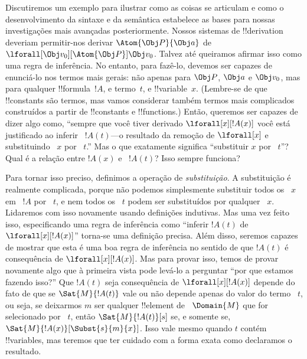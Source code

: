 \documentclass[../../../include/open-logic-section]{subfiles}
\begin{document}


Discutiremos um exemplo para ilustrar como as coisas se articulam e
como o desenvolvimento da sintaxe e da semântica estabelece as bases para
nossas investigações mais avançadas posteriormente. Nossos sistemas de !!{derivation} deveriam permitir-nos
derivar $\Atom{\Obj P}{\Obj a}$ de $\lforall[\Obj
v_0][\Atom{\Obj P}]{\Obj v_0}$. Talvez até queiramos afirmar isso como uma
regra de inferência. No entanto, para fazê-lo, devemos ser capazes de enunciá-lo
nos termos mais gerais: não apenas para $\Obj P$, $\Obj a$ e $\Obj
v_0$, mas para qualquer !!{formula}~$!A$, e termo~$t$, e
!!{variable}~$x$. (Lembre-se de que !!{constant}s são termos, mas vamos
considerar também termos mais complicados construídos a partir de !!{constant}s e
!!{function}s.) Então, queremos ser capazes de dizer algo como,
``sempre que você tiver derivado $\lforall[x][!A(x)]$ você está justificado
ao inferir ~$!A(t)$---o resultado da remoção de $\lforall[x]$ e
substituindo ~$x$ por ~$t$.'' Mas o que exatamente significa ``substituir $x$ por ~$t$''?
Qual é a relação entre $!A(x)$ e ~$!A(t)$?  Isso
sempre funciona?

Para tornar isso preciso, definimos a operação de \emph{substituição}.
A substituição é realmente complicada, porque não podemos simplesmente substituir
todos os ~$x$ em ~$!A$ por ~$t$, e nem todos os ~$t$ podem ser substituídos por
qualquer ~$x$. Lidaremos com isso novamente usando definições indutivas. Mas
uma vez feito isso, especificando uma regra de inferência como ``inferir $!A(t)$
de $\lforall[x][!A(x)]$'' torna-se uma definição precisa.  Além disso,
seremos capazes de mostrar que esta é uma boa regra de inferência no sentido
de que $!A(t)$ é consequência de $\lforall[x][!A(x)]$. Mas para provar isso, temos
de provar novamente algo que à primeira vista pode levá-lo a perguntar
``por que estamos fazendo isso?'' Que $!A(t)$ seja consequência de $\lforall[x][!A(x)]$
depende do fato de que se $\Sat{M}{!A(t)}$ vale ou não depende
apenas do valor do termo ~$t$, ou seja, se deixarmos $m$ ser qualquer
!!{element} de ~$\Domain{M}$ que for selecionado por ~$t$, então
$\Sat{M}{!A(t)}[s]$ se, e somente se, $\Sat{M}{!A(x)}[\Subst{s}{m}{x}]$. Isso vale
mesmo quando $t$ contém !!{variable}s, mas teremos que ter cuidado
com a forma exata como declaramos o resultado.
\end{document}
